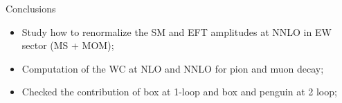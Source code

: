 \documentclass[11pt]{beamer}
\begin{document}
\begin{frame}{Conclusions}
    \begin{itemize}
        \item Study how to renormalize the SM and EFT amplitudes at NNLO in EW sector (MS + MOM);
        \item Computation of the WC at NLO and NNLO for pion and muon decay;
        \item Checked the contribution of box at 1-loop and box and penguin at 2 loop;
    \end{itemize}
\end{frame}










\small
    

\end{document}
